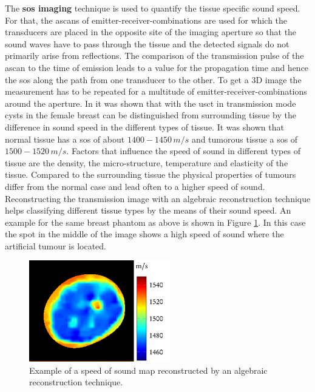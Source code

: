\medskip

The \textbf{\ac{sos} imaging} technique is used to quantify the tissue specific sound speed. For that, the \acp{ascan} of  emitter-receiver-combinations are used for which the transducers are placed in the opposite site of the imaging aperture so that the sound waves have to pass through the tissue and the detected signals do not primarily arise from reflections. The comparison of the transmission pulse of the \ac{ascan} to the time of emission leads to a value for the propagation time and hence the \ac{sos} along the path from one transducer to the other. To get a 3D image the measurement has to be repeated for a multitude of emitter-receiver-combinations around the aperture. In \cite{Greenleaf1981ClinicalTomography} it was shown that with the \ac{usct} in transmission mode cysts in the female breast can be distinguished from surrounding tissue by the difference in sound speed in the different types of tissue. It was shown that normal tissue has a \ac{sos} of about $1400-1450 \, m/s$ and tumorous tissue a \ac{sos} of $1500 - 1520\, m/s$. Factors that influence the speed of sound in different types of tissue are the density, the micro-structure, temperature and elasticity of the tissue. Compared to the surrounding tissue the physical properties of tumours differ from the normal case and lead often to a higher speed of sound. 
Reconstructing the transmission image with an algebraic reconstruction technique helps classifying different tissue types by the means of their sound speed. An example for the same breast phantom as above is shown in Figure \ref{sos_image}. In this case the spot in the middle of the image shows a high speed of sound where the artificial tumour is located.

\begin{figure}[H]
    \centering
    \includegraphics[width=0.55\textwidth]{Graphics/sos_example.png}
    \caption{ Example of a speed of sound map reconstructed by an algebraic reconstruction technique.}
    \label{sos_image}
\end{figure}


